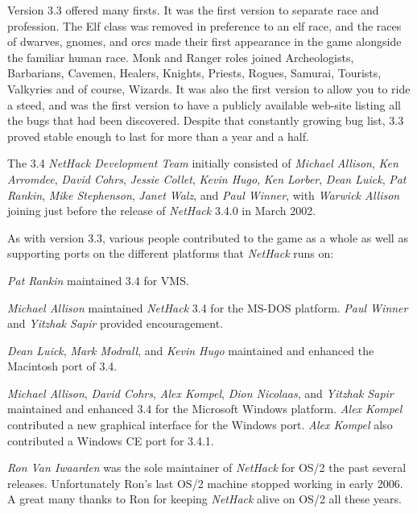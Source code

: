 \documentclass[titlepage]{article}
\begin{document}
\medskip
Version 3.3 offered many firsts. It was the first version to separate race
and profession. The Elf class was removed in preference to an elf race,
and the races of dwarves, gnomes, and orcs made their first appearance in
the game alongside the familiar human race.  Monk and Ranger roles joined
Archeologists, Barbarians, Cavemen, Healers, Knights, Priests, Rogues, Samurai,
Tourists, Valkyries and of course, Wizards.  It was also the first version
to allow you to ride a steed, and was the first version to have a publicly
available web-site listing all the bugs that had been discovered.  Despite
that constantly growing bug list, 3.3 proved stable enough to last for
more than a year and a half.

\medskip
The 3.4 \textit{NetHack Development Team} initially consisted of
\textit{Michael Allison}, \textit{Ken Arromdee},
\textit{David Cohrs}, \textit{Jessie Collet}, \textit{Kevin Hugo}, \textit{Ken Lorber},
\textit{Dean Luick}, \textit{Pat Rankin}, \textit{Mike Stephenson},
\textit{Janet Walz}, and \textit{Paul Winner}, with \textit{ Warwick Allison} joining
just before the release of \textit{NetHack} 3.4.0 in March 2002.

\medskip
As with version 3.3, various people contributed to the game as a whole as
well as supporting ports on the different platforms that \textit{NetHack}
runs on:

\medskip
\noindent\textit{Pat Rankin} maintained 3.4 for VMS.

\medskip
\noindent \textit{Michael Allison} maintained \textit{NetHack} 3.4 for the MS-DOS
platform.
\textit{Paul Winner} and \textit{Yitzhak Sapir} provided encouragement.

\medskip
\noindent \textit{Dean Luick}, \textit{Mark Modrall}, and \textit{Kevin Hugo} maintained and
enhanced the Macintosh port of 3.4.

\medskip
\noindent \textit{Michael Allison}, \textit{David Cohrs}, \textit{Alex Kompel},
\textit{Dion Nicolaas}, and
\textit{Yitzhak Sapir} maintained and enhanced 3.4 for the Microsoft Windows
platform.
\textit{Alex Kompel} contributed a new graphical interface for the Windows port.
\textit{Alex Kompel} also contributed a Windows CE port for 3.4.1.

\medskip
\noindent \textit{Ron Van Iwaarden} was the sole maintainer of \textit{NetHack} for
OS/2 the past
several releases. Unfortunately Ron's last OS/2 machine stopped working in
early 2006. A great many thanks to Ron for keeping \textit{NetHack} alive on
OS/2 all these years.
\end{document}
